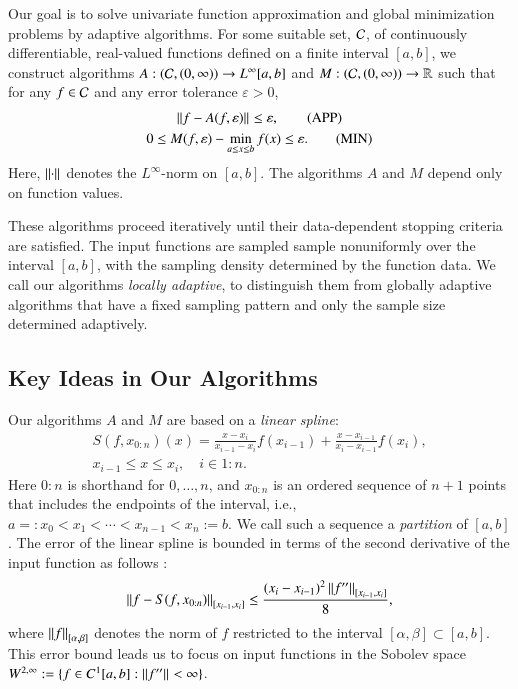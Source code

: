 \documentclass[review]{elsarticle}
\newcommand{\abstol}{\varepsilon}
\newcommand{\oton}{1\!:\!n}
\newcommand{\datasites}{x_{0:n}}
\theoremstyle{definition}
\renewcommand{\cw}{W}
\begin{document}
Our goal is to solve univariate function approximation and global minimization
problems by adaptive algorithms. For some suitable set, $\cc$, of continuously
differentiable, real-valued functions defined on a finite interval $[a,b]$, we
construct algorithms $A:(\cc,(0,\infty)) \to L^{\infty}[a,b]$ and $M:
(\cc,(0,\infty)) \to \reals$ such that for any $f \in \cc$ and any error
tolerance $\abstol > 0$, \begin{gather} \norm{f - A(f,\abstol)} \le \abstol,
\tag{APP} \label{appxprob} \\ 0 \le M(f,\abstol) - \min_{a \le x \le b} f(x) \le
\abstol. \tag{MIN} \label{optprob} \end{gather} Here, $\norm{\cdot}$ denotes the
$L^{\infty}$-norm on $[a,b]$. The algorithms $A$ and $M$ depend only on function
values.

These algorithms proceed iteratively until their data-dependent stopping
criteria are satisfied. The input functions are sampled sample nonuniformly over
the interval $[a,b]$, with the sampling density determined by the function data.
We call our algorithms \emph{locally adaptive}, to distinguish them from
globally adaptive algorithms that have a fixed sampling pattern and only the
sample size determined adaptively.

\subsection{Key Ideas in Our Algorithms} \label{subsec:keyideas}

Our algorithms $A$ and $M$ are based on a \emph{linear spline}: 
\begin{multline} \label{splinedef}
   S(f,\datasites)(x) =  
   \frac{x-x_i}{x_{i-1} - x_i} f(x_{i-1}) + \frac{x-x_{i-1}}{x_{i} - x_{i-1}}f(x_i), 
\\ x_{i-1} \le x \le x_i, \quad i \in \oton.
\end{multline}
Here ${0\!:\!n}$ is shorthand for ${0, \ldots, n}$, and $\datasites$ is an
ordered sequence of $n+1$ points that includes the endpoints of the interval,
i.e., $a=:x_0 <x_1 < \cdots < x_{n-1} < x_{n}:=b$. We call such a sequence a
\emph{partition} of $[a,b]$. The error of the linear spline is bounded in terms
of the second derivative of the input function as follows \cite[Theorem
3.3]{BurFaiBur16a}:
\begin{equation} \label{appxerrbda}
	\norm[{[x_{i-1},x_i]}]{f - S(f,\datasites)} 
	\le \frac{(x_i - x_{i-1})^2\norm[{[x_{i-1},x_i]}]{f''}}{8}, 
\end{equation}
where $\norm[{[\alpha,\beta]}]{f}$ denotes the norm of $f$ restricted to the
interval $[\alpha,\beta] \subset [a,b]$. This error bound leads us to focus on
input functions in the Sobolev space $\cw^{2,\infty} := \{f \in C^1[a,b] :
\norm{f''} < \infty \}$.
\end{document}
